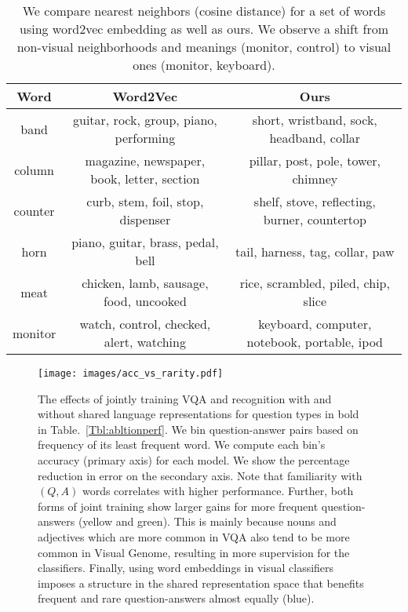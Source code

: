\documentclass[10pt,twocolumn,letterpaper]{article}
\begin{document}
\begin{table*}[t]
\scriptsize
    \centering
    \begin{tabular}{|c|c|c|}
    \hline
    Word & Word2Vec & Ours \\
    \hline
    band & guitar, rock, group, piano, performing & short, wristband, sock, headband, collar \\
    column & magazine, newspaper, book, letter, section & pillar, post, pole, tower, chimney \\
    counter & curb, stem, foil, stop, dispenser & shelf, stove, reflecting, burner, countertop \\
    horn & piano, guitar, brass, pedal, bell & tail, harness, tag, collar, paw \\
    meat & chicken, lamb, sausage, food, uncooked & rice, scrambled, piled, chip, slice \\
    monitor & watch, control, checked, alert, watching & keyboard, computer, notebook, portable, ipod \\
    \hline
    \end{tabular}
    \caption{We compare nearest neighbors (cosine distance) for a set of words using word2vec embedding as well as ours. We observe a shift from non-visual neighborhoods and meanings (monitor, control) to visual ones (monitor, keyboard).}
    \label{Tbl:embeddingexamples}
\end{table*}
\begin{figure}[t]
\begin{center}
\texttt{[image: images/acc\_vs\_rarity.pdf]}
\vspace{-1cm}
\end{center}
  \caption{The effects of jointly training VQA and recognition with and without shared language representations for question types in bold in Table.~\ref{Tbl:abltionperf}. We bin question-answer pairs based on frequency of its least frequent word. We compute each bin's accuracy (primary axis) for each model. We show the percentage reduction in error on the secondary axis. Note that familiarity with $(Q,A)$ words correlates with higher performance. Further, both forms of joint training show larger gains for more frequent question-answers (yellow and green). This is mainly because nouns and adjectives which are more common in VQA also tend to be more common in Visual Genome, resulting in more supervision for the classifiers. Finally, using word embeddings in visual classifiers imposes a structure in the shared representation space that benefits frequent and rare question-answers almost equally (blue).}
\label{fig:acc_vs_rarity}
\end{figure} 
\end{document}
